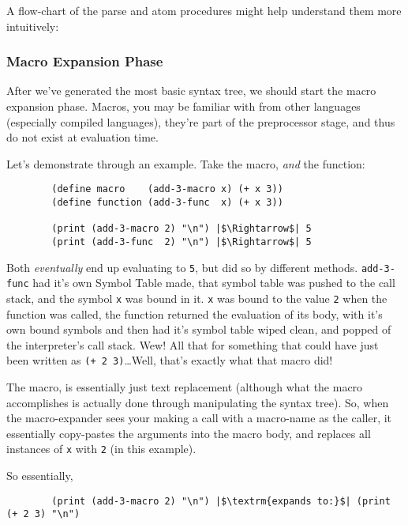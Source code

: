 \documentclass{article}
\newcommand{\code}[1]{\texttt{#1}}
\begin{document}
      \clearpage

      A flow-chart of the parse and atom procedures might help understand them
      more intuitively:


      \clearpage

      \subsubsection{Macro Expansion Phase}
      After we've generated the most basic syntax tree, we should start the macro
      expansion phase.  Macros, you may be familiar with from other languages
      (especially compiled languages), they're part of the preprocessor stage,
      and thus do not exist at evaluation time.

      Let's demonstrate through an example. Take the macro, \emph{and} the function:

      \begin{verbatim}
        (define macro    (add-3-macro x) (+ x 3))
        (define function (add-3-func  x) (+ x 3))

        (print (add-3-macro 2) "\n") |$\Rightarrow$| 5
        (print (add-3-func  2) "\n") |$\Rightarrow$| 5
      \end{verbatim}

      Both \emph{eventually} end up evaluating to \code{5}, but did so by different
      methods. \code{add-3-func} had it's own Symbol Table made, that symbol table
      was pushed to the call stack, and the symbol \code{x} was bound in it.
      \code{x} was bound to the value \code{2} when the function was called, the
      function returned the evaluation of its body, with it's own bound symbols
      and then had it's symbol table wiped clean, and popped of the interpreter's
      call stack. Wew! All that for something that could have just been written
      as \code{(+ 2 3)}\ldots Well, that's exactly what that macro did!

      The macro, is essentially just text replacement (although what the macro
      accomplishes is actually done through manipulating the syntax tree).
      So, when the macro-expander sees your making a call with a macro-name as the
      caller, it essentially copy-pastes the arguments into the macro body, and
      replaces all instances of \code{x} with \code{2} (in this example).

      So essentially,
      \begin{verbatim}
        (print (add-3-macro 2) "\n") |$\textrm{expands to:}$| (print (+ 2 3) "\n")
      \end{verbatim}
\end{document}
